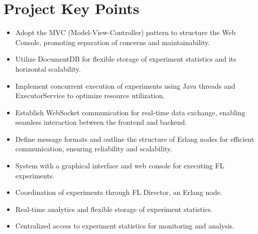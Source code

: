 \section{Project Key Points}
\begin{itemize}
    \item Adopt the MVC (Model-View-Controller) pattern to structure the Web Console, promoting separation of concerns and maintainability.
    \item Utilize DocumentDB for flexible storage of experiment statistics and its horizontal scalability.
    \item Implement concurrent execution of experiments using Java threads and ExecutorService to optimize resource utilization.
    \item Establish WebSocket communication for real-time data exchange, enabling seamless interaction between the frontend and backend.
    \item Define message formats and outline the structure of Erlang nodes for efficient communication, ensuring reliability and scalability.
    \item System with a graphical interface and web console for executing FL experiments.
    \item Coordination of experiments through FL Director, an Erlang node.
    \item Real-time analytics and flexible storage of experiment statistics.
    \item Centralized access to experiment statistics for monitoring and analysis.
\end{itemize}
